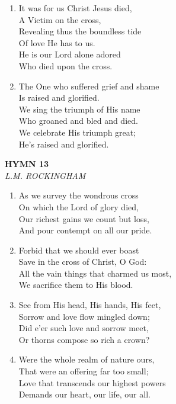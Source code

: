 \begin{enumerate}
    \item It was for us Christ Jesus died, \\
        A Victim on the cross, \\
        Revealing thus the boundless tide \\
        Of love He has to us. \\
        He is our Lord alone adored \\
        Who died upon the cross.

    \item The One who suffered grief and shame \\
        Is raised and glorified. \\
        We sing the triumph of His name \\
        Who groaned and bled and died. \\
        We celebrate His triumph great; \\
        He's raised and glorified.

\end{enumerate}

\newpage
\begin{center}
    {\Large \textbf{HYMN 13}}
    \\
    \textit{L.M. ROCKINGHAM}
\end{center}
\vspace{1em}

\begin{enumerate}
    \item As we survey the wondrous cross \\
        On which the Lord of glory died, \\
        Our richest gains we count but loss, \\
        And pour contempt on all our pride.

    \item Forbid that we should ever boast \\
        Save in the cross of Christ, O God: \\
        All the vain things that charmed us most, \\
        We sacrifice them to His blood.

    \item See from His head, His hands, His feet, \\
        Sorrow and love flow mingled down; \\
        Did e'er such love and sorrow meet, \\
        Or thorns compose so rich a crown?

    \item Were the whole realm of nature ours, \\
        That were an offering far too small; \\
        Love that transcends our highest powers \\
        Demands our heart, our life, our all.

\end{enumerate}

